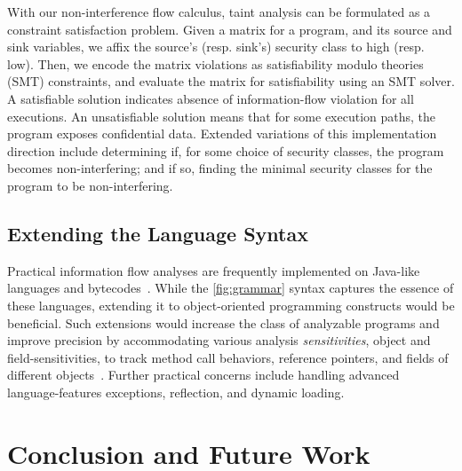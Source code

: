 \documentclass[conference]{IEEEtran}
\begin{document}
With our non-interference flow calculus, taint analysis can be formulated as a constraint satisfaction problem.
Given a matrix for a program, and its source and sink variables,
we affix the source's (resp. sink's) security class to high (resp. low).
Then, we encode the matrix violations as satisfiability modulo theories (SMT) constraints, and evaluate the matrix for satisfiability using an SMT solver.
A satisfiable solution indicates absence of information-flow violation for all executions.
An unsatisfiable solution means that for some execution paths, the program exposes confidential data.
Extended variations of this implementation direction include
determining if, for some choice of security classes, the program becomes non-interfering;
and if so, finding the minimal security classes for the program to be non-interfering.

\subsection{Extending the Language Syntax}

Practical information flow analyses are frequently implemented on Java-like languages and bytecodes~\cite{hammer2009,huang2014,arzt2014,pauck2018}.
While the \autoref{fig:grammar} syntax captures the essence of these languages, extending it to object-oriented programming constructs would be beneficial.
Such extensions would increase the class of analyzable programs and improve precision by accommodating various analysis \emph{sensitivities},
\eg object and field-sensitivities, to track method call behaviors, reference pointers, and fields of different objects~\cite{arzt2014,hammer2009}.
Further practical concerns include handling advanced language-features \eg exceptions, reflection, and dynamic loading.


\section{Conclusion and Future Work}
\label{sec:conclusion}
\end{document}
